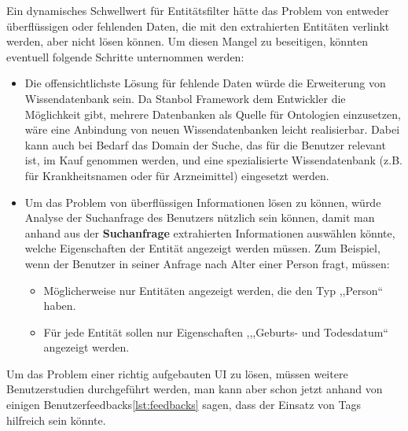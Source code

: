 Ein dynamisches Schwellwert für Entitätsfilter hätte das Problem von entweder überflüssigen oder fehlenden Daten, die mit den extrahierten Entitäten verlinkt werden, aber nicht lösen können. Um diesen Mangel zu beseitigen, könnten eventuell folgende Schritte unternommen werden:
\begin{itemize}
\item Die offensichtlichste Lösung für fehlende Daten würde die Erweiterung von Wissendatenbank sein. Da Stanbol Framework dem Entwickler die Möglichkeit gibt, mehrere Datenbanken als Quelle für Ontologien einzusetzen, wäre eine Anbindung von neuen Wissendatenbanken leicht realisierbar. Dabei kann auch bei Bedarf das Domain der Suche, das für die Benutzer relevant ist, im Kauf genommen werden, und eine spezialisierte Wissendatenbank (z.B. für Krankheitsnamen oder für Arzneimittel) eingesetzt werden.
\item Um das Problem von überflüssigen Informationen lösen zu können, würde Analyse der Suchanfrage des Benutzers nützlich sein können, damit man anhand aus der \textbf{Suchanfrage} extrahierten Informationen auswählen könnte, welche Eigenschaften der Entität angezeigt werden müssen. Zum Beispiel, wenn der Benutzer in seiner Anfrage nach Alter einer Person fragt, müssen:
\begin{itemize}
\item Möglicherweise nur Entitäten angezeigt werden, die den Typ ,,Person`` haben.
\item Für jede Entität sollen nur Eigenschaften ,,,Geburts- und Todesdatum`` angezeigt werden.
\end{itemize}
\end{itemize}

Um das Problem einer richtig aufgebauten UI zu lösen, müssen weitere Benutzerstudien durchgeführt werden, man kann aber schon jetzt anhand von einigen Benutzerfeedbacks\ref{lst:feedbacks} sagen, dass der Einsatz von Tags hilfreich sein könnte.
